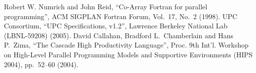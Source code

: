 %
%
% 
% 
%

\begin{thebibliography}{99.}%
%
%
 Robert W. Numrich and John Reid, ``Co-Array Fortran for
		parallel programming'', ACM SIGPLAN Fortran Forum, Vol.~17,
		No.~2 (1998).
 UPC Consortium, ``UPC Specifications, v1.2'', Lawrence
		Berkeley National Lab (LBNL-59208) (2005).
 David Callahan, Bradford L.~Chamberlain and Hans
		P.~Zima,  ``The Cascade High Productivity Language'', Proc. 9th
		Int'l. Workshop on High-Level Parallel Programming Models and
		Supportive Environments (HIPS 2004), pp.~52--60 (2004).
%

\end{thebibliography}
